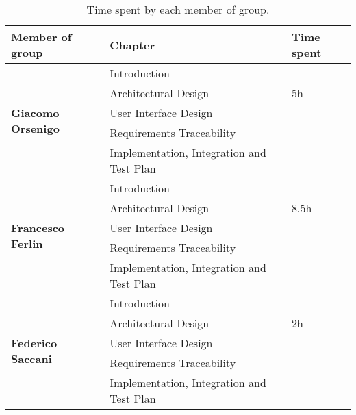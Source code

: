 \begin{table}[H]
    \centering
    \begin{tabular}{|l|l|l|}
        \hline
        \textbf{Member of group }                  & \textbf{Chapter}                          & \textbf{Time spent} \\\hline
        \multirow{5}{*}{\textbf{Giacomo Orsenigo}} & Introduction                              &                     \\
                                                   & Architectural Design                      & 5h                  \\
                                                   & User Interface Design                     &                     \\
                                                   & Requirements Traceability                 &                     \\
                                                   & Implementation, Integration and Test Plan &                     \\\hline
        \multirow{5}{*}{\textbf{Francesco Ferlin}} & Introduction                              &                     \\
                                                   & Architectural Design                      & 8.5h                \\
                                                   & User Interface Design                     &                     \\
                                                   & Requirements Traceability                 &                     \\
                                                   & Implementation, Integration and Test Plan &                     \\\hline
        \multirow{5}{*}{\textbf{Federico Saccani}} & Introduction                              &                     \\
                                                   & Architectural Design                      & 2h                  \\
                                                   & User Interface Design                     &                     \\
                                                   & Requirements Traceability                 &                     \\
                                                   & Implementation, Integration and Test Plan &                     \\\hline
    \end{tabular}
    \caption{Time spent by each member of group.}
    \label{table:Time spent}
\end{table}
